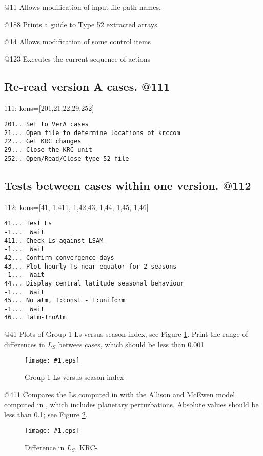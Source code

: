\documentclass{article}  %
\newcommand{\igc}[1]{\texttt{[image: \#1.eps]}}
\begin{document}
@11 Allows modification of input file path-names.

@188 Prints a guide to Type 52 extracted arrays.

@14  Allows modification of some control items

@123 Executes the current sequence of actions 

\subsection{Re-read version A cases. @111} %
111: kons=[201,21,22,29,252] 
\vspace{-3.mm} 
\begin{verbatim}
201.. Set to VerA cases
21... Open file to determine locations of krccom
22... Get KRC changes
29... Close the KRC unit
252.. Open/Read/Close type 52 file
\end{verbatim}

\subsection{Tests between cases within one version. @112} %

112: kons=[41,-1,411,-1,42,43,-1,44,-1,45,-1,46] 
\vspace{-3.mm} 
\begin{verbatim}
41... Test Ls
-1...  Wait
411.. Check Ls against LSAM
-1...  Wait
42... Confirm convergence days
43... Plot hourly Ts near equator for 2 seasons
-1...  Wait
44... Display central latitude seasonal behaviour
-1...  Wait
45... No atm, T:const - T:uniform
-1...  Wait
46... Tatm-TnoAtm
\end{verbatim}

@41 Plots of Group 1 Ls versus season index, see Figure \ref{p41}.  Print the
range of differences in $L_S$ betwees cases, which should be less than 0.001

\begin{figure}[!ht] \igc{p41}
\caption[Ls] {Group 1 Ls versus season index
\label{p41} } \end{figure}

@411 Compares the Ls computed in  with the Allison and McEwen model computed in , which includes planetary perturbations.  Absolute values should be less than 0.1; see Figure \ref{p411}. 

\begin{figure}[!ht] \igc{p411}
\caption[Ls difference] {Difference in $L_S$, KRC- 
\label{p411} } \end{figure}
\end{document}
